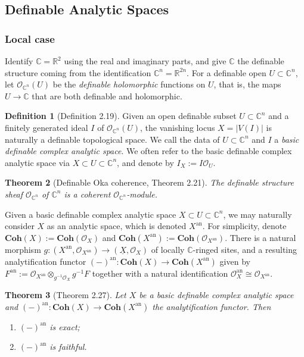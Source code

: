 \documentclass{amsart}
\newtheorem{theorem}{Theorem}[subsection]
\theoremstyle{definition}
\newtheorem{definition}[theorem]{Definition}
\numberwithin{equation}{section}
\newcommand{\analytic}{\mathrm{an}}
\begin{document}
\subsection{Definable Analytic Spaces}
\subsubsection{Local case}
Identify $\mathbb{C} = \mathbb{R}^2$ using the real and imaginary parts,
and give $\mathbb{C}$ the definable structure coming from the identification $\mathbb{C}^n = \mathbb{R}^{2n}$.
For a definable open $U \subset \mathbb{C}^n$,
let $\mathcal{O}_{\mathbb{C}^n}(U)$ be the \emph{definable holomorphic} functions on $U$,
that is, the maps $U \to \mathbb{C}$ that are both definable and holomorphic.

\begin{definition}[Definition 2.19]
  Given an open definable subset $U \subset \mathbb{C}^n$ and
  a finitely generated ideal $I$ of $\mathcal{O}_{\mathbb{C}^n}(U)$,
  the vanishing locus $X = |V(I)|$ is naturally a definable topological space.
  We call the data of $U \subset \mathbb{C}^n$ and $I$ a \emph{basic definable complex analytic space}.
  We often refer to the basic definable complex analytic space via $X \subset U \subset \mathbb{C}^n$,
  and denote by $I_X := I\mathcal{O}_U$.
\end{definition}

\begin{theorem}[Definable Oka coherence, Theorem 2.21]
  The definable structure sheaf $\mathcal{O}_{\mathbb{C}^n}$ of $\mathbb{C}^n$ is a coherent $\mathcal{O}_{\mathbb{C}^n}$-module.
\end{theorem}

Given a basic definable complex analytic space $X \subset U \subset \mathbb{C}^n$,
we may naturally consider $X$ as an analytic space,
which is denoted $X^{\analytic}$.
For simplicity, denote $\mathbf{Coh}(X) := \mathbf{Coh}(\mathcal{O}_X)$ and
$\mathbf{Coh}(X^{\analytic}) := \mathbf{Coh}(\mathcal{O}_{X^{\analytic}})$.
There is a natural morphism $g: (X^{\analytic},\mathcal{O}_{X^{\analytic}}) \to (\underline{X},\mathcal{O}_X)$
of locally $\mathbb{C}$-ringed sites,
and a resulting analytification functor $(-)^{\analytic}: \mathbf{Coh}(X) \to \mathbf{Coh}(X^{\analytic})$
given by $F^{\analytic} := \mathcal{O}_{X^{\analytic}} \otimes_{g^{-1}\mathcal{O}_X} g^{-1}F$ together with
a natural identification $\mathcal{O}_X^{\analytic} \cong \mathcal{O}_{X^{\analytic}}$.

\begin{theorem}[Theorem 2.27]
  Let $X$ be a basic definable complex analytic space and
  $(-)^{\analytic} : \mathbf{Coh}(X) \to \mathbf{Coh}(X^{\analytic})$ the analytification functor.
  Then
  \begin{enumerate}[label = {(\arabic*)}]
    \item $(-)^{\analytic}$ is exact;
    \item $(-)^{\analytic}$ is faithful.
  \end{enumerate}
\end{theorem}
\end{document}
